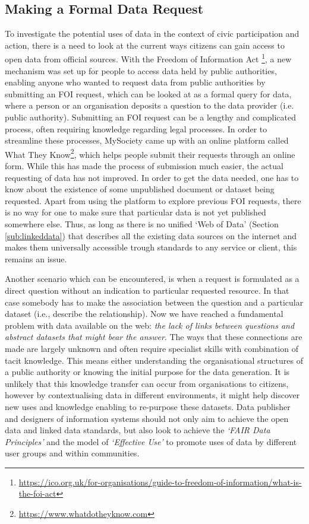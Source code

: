 \subsection{Making a Formal Data Request}
\label{sub:data_req}
To investigate the potential uses of data in the context of civic participation and action, there is a need to look at the current ways citizens can gain access to open data from official sources. With the Freedom of Information Act \footnote{\url{https://ico.org.uk/for-organisations/guide-to-freedom-of-information/what-is-the-foi-act}}, a new mechanism was set up for people to access data held by public authorities, enabling anyone who wanted to request data from public authorities by submitting an FOI request, which can be looked at as a formal query for data, where a person or an organisation deposits a question to the data provider (i.e. public authority). Submitting an FOI request can be a lengthy and complicated process, often requiring knowledge regarding legal processes. In order to streamline these processes, MySociety came up with an online platform called What They Know\footnote{\url{https://www.whatdotheyknow.com}}, which helps people submit their requests through an online form. While this has made the process of submission much easier, the actual requesting of data has not improved. In order to get the data needed, one has to know about the existence of some unpublished document or dataset being requested. Apart from using the platform to explore previous FOI requests, there is no way for one to make sure that particular data is not yet published somewhere else. Thus, as long as there is no unified `Web of Data' (Section \ref{sub:linkeddata}) that describes all the existing data sources on the internet and makes them universally accessible trough standards to any service or client, this remains an issue.

Another scenario which can be encountered, is when a request is formulated as a direct question without an indication to particular requested resource. In that case somebody has to make the association between the question and a particular dataset (i.e., describe the relationship). Now we have reached a fundamental problem with data available on the web: \textit{the lack of links between questions and abstract datasets that might bear the answer}. The ways that these connections are made are largely unknown and often require specialist skills with combination of tacit knowledge. This means either understanding the organisational structures of a public authority or knowing the initial purpose for the data generation. It is unlikely that this knowledge transfer can occur from organisations to citizens, however by contextualising data in different environments, it might help discover new uses and knowledge enabling to re-purpose these datasets. Data publisher and designers of information systems should not only aim to achieve the open data and linked data standards, but also look to achieve the \textit{`FAIR Data Principles'} \citep{wilkinson_fair_2016} and the model of \textit{`Effective Use'} \citep{gurstein_effective_2003,gurstein_open_2011} to promote uses of data by different user groups and within communities.
\newline

